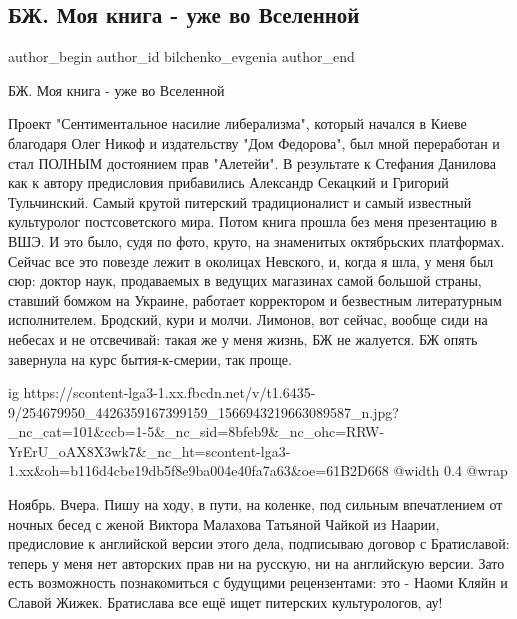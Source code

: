  
 
 
 
 
 
\subsection{БЖ. Моя книга - уже во Вселенной}
\label{sec:10_11_2021.fb.bilchenko_evgenia.1.kniga}
 
\ifcmt
 author_begin
   author_id bilchenko_evgenia
 author_end
\fi

БЖ. Моя книга - уже во Вселенной

Проект "Сентиментальное насилие либерализма", который начался в Киеве благодаря
Олег Никоф и издательству "Дом Федорова", был мной переработан и стал ПОЛНЫМ
достоянием прав "Алетейи". В результате к Стефания Данилова как к автору
предисловия прибавились Александр Секацкий и Григорий Тульчинский. Самый крутой
питерский традиционалист и самый известный культуролог постсоветского мира.
Потом книга прошла без меня презентацию в ВШЭ. И это было, судя по фото, круто,
на знаменитых октябрьских платформах. Сейчас все это повезде лежит в околицах
Невского, и, когда я шла, у меня был сюр: доктор наук, продаваемых в ведущих
магазинах самой большой страны, ставший бомжом на Украине, работает корректором
и безвестным литературным исполнителем.  Бродский, кури и молчи. Лимонов, вот
сейчас, вообще сиди на небесах и не отсвечивай: такая же у меня жизнь, БЖ не
жалуется. БЖ опять завернула на курс бытия-к-смерии, так проще. 

\ifcmt
  ig https://scontent-lga3-1.xx.fbcdn.net/v/t1.6435-9/254679950_4426359167399159_1566943219663089587_n.jpg?_nc_cat=101&ccb=1-5&_nc_sid=8bfeb9&_nc_ohc=RRW-YrErU_oAX8X3wk7&_nc_ht=scontent-lga3-1.xx&oh=b116d4cbe19db5f8e9ba004e40fa7a63&oe=61B2D668
  @width 0.4
  @wrap 
\fi

Ноябрь. Вчера. Пишу на ходу, в пути, на коленке, под сильным впечатлением от
ночных бесед с женой Виктора Малахова Татьяной Чайкой из Наарии, предисловие к
английской версии этого дела, подписываю договор с Братиславой: теперь у меня
нет авторских прав ни на русскую, ни на английскую версии. Зато есть
возможность познакомиться с будущими рецензентами: это - Наоми Кляйн и Славой
Жижек. Братислава все ещё ищет питерских культурологов, ау!

